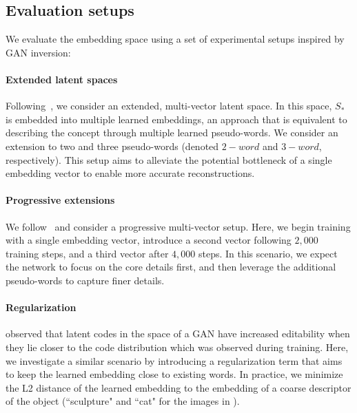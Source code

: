 \subsection{Evaluation setups}

We evaluate the embedding space using a set of experimental setups inspired by GAN inversion:

\paragraph{Extended latent spaces}
Following~\citet{abdal2019image2stylegan}, we consider an extended, multi-vector latent space. In this space, $S_*$ is embedded into multiple learned embeddings, an approach that is equivalent to describing the concept through multiple learned pseudo-words. We consider an extension to two and three pseudo-words (denoted $2-word$ and $3-word$, respectively). This setup aims to alleviate the potential bottleneck of a single embedding vector to enable more accurate reconstructions.

\paragraph{Progressive extensions}
We follow~\citet{tov2021designing} and consider a progressive multi-vector setup. Here, we begin training with a single embedding vector, introduce a second vector following $2,000$ training steps, and a third vector after $4,000$ steps. In this scenario, we expect the network to focus on the core details first, and then leverage the additional pseudo-words to capture finer details.

\paragraph{Regularization}
\citet{tov2021designing} observed that latent codes in the space of a GAN have increased editability when they lie closer to the code distribution which was observed during training. Here, we investigate a similar scenario by introducing a regularization term that aims to keep the learned embedding close to existing words. In practice, we minimize the L2 distance of the learned embedding to the embedding of a coarse descriptor of the object (\eg ``sculpture" and ``cat" for the images in ).

